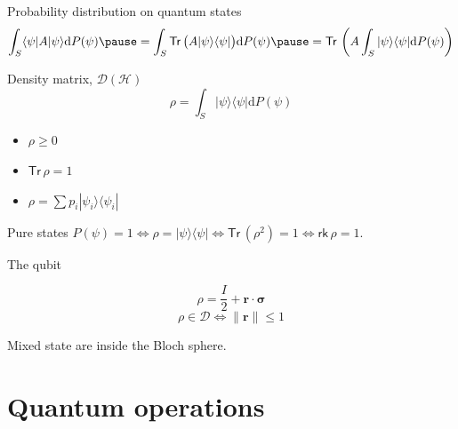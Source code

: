 \documentclass{beamer}
\newcommand{\ket}[1]{|#1\rangle}
\newcommand{\bra}[1]{\langle#1|}
\newcommand{\dd}{\mathrm{d}}
\newcommand{\bs}{\boldsymbol}
\newcommand{\Tr}{\mathsf{Tr}\,}
\newcommand{\rk}{\mathsf{rk}\,}
\begin{document}
\begin{frame}{Probability distribution on quantum states}
  \[\int_S \bra \psi A\ket \psi \dd P(\psi)\pause = \int_S \Tr\big(A\ket \psi \bra \psi\big) \dd
    P(\psi) \pause = \Tr\left(A \int_S\ket \psi \bra \psi \dd P(\psi) \right)\]
  \pause{}
  \begin{block}{Density matrix, $\mathcal{D}(\mathcal{H})$}
    \[\rho = \int_S\ket \psi \bra \psi \dd P(\psi)\]
  \end{block}

  \pause{}

\begin{itemize}
  \item $\rho \geqslant 0$
    \pause{}
  \item $\Tr \rho = 1$
    \pause{}
  \item $\rho = \sum p_i \ket {\psi_i} \bra{\psi_i}$
\end{itemize}

  \pause{} \vspace{3mm}

\begin{block}{Pure states}
  $P(\psi) = 1 \iff \rho = \ket \psi \bra \psi \iff \Tr(\rho^2) = 1 \iff \rk
  \rho = 1$.
\end{block}
\end{frame}

\begin{frame}{The qubit}

  \vfill

  \[\rho = \frac I2 + \bs r \cdot \bs \sigma\]
  \[\rho \in \mathcal{D} \iff \|\bs r\| \leqslant 1\]

  \vfill

  \begin{center}
    \Large Mixed state are \alert{inside} the Bloch sphere.
  \end{center}

  \vfill

\end{frame}



\section{Quantum operations}
\end{document}
